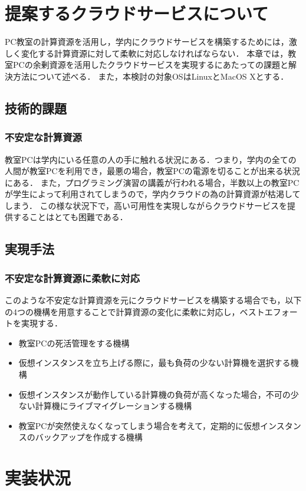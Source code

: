 \documentclass[11pt,a4]{jsarticle}
\begin{document}
\section{提案するクラウドサービスについて}
PC教室の計算資源を活用し，学内にクラウドサービスを構築するためには，激しく変化する計算資源に対して柔軟に対応しなければならない．
本章では，教室PCの余剰資源を活用したクラウドサービスを実現するにあたっての課題と解決方法について述べる．
また，本検討の対象OSはLinuxとMacOS Xとする．
\subsection{技術的課題}
\subsubsection{不安定な計算資源}
教室PCは学内にいる任意の人の手に触れる状況にある．つまり，学内の全ての人間が教室PCを利用でき，最悪の場合，教室PCの電源を切ることが出来る状況にある．
また，プログラミング演習の講義が行われる場合，半数以上の教室PCが学生によって利用されてしまうので，学内クラウドの為の計算資源が枯渇してしまう．
この様な状況下で，高い可用性を実現しながらクラウドサービスを提供することはとても困難である．
\subsection{実現手法}
\subsubsection{不安定な計算資源に柔軟に対応}
このような不安定な計算資源を元にクラウドサービスを構築する場合でも，以下の4つの機構を用意することで計算資源の変化に柔軟に対応し，ベストエフォートを実現する．
\begin{itemize}
	\item 教室PCの死活管理をする機構
	\item 仮想インスタンスを立ち上げる際に，最も負荷の少ない計算機を選択する機構
	\item 仮想インスタンスが動作している計算機の負荷が高くなった場合，不可の少ない計算機にライブマイグレーションする機構
	\item 教室PCが突然使えなくなってしまう場合を考えて，定期的に仮想インスタンスのバックアップを作成する機構
\end{itemize}

\section{実装状況}
\end{document}

